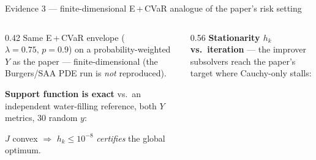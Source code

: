 \documentclass[aspectratio=169,10pt]{beamer}
\newcommand{\fdata}[1]{data/#1}
\begin{document}
\begin{frame}{Evidence 3 --- finite-dimensional E\,+\,CVaR analogue of the paper's risk setting}
  \small
  \begin{columns}[T]
  \begin{column}{0.42\textwidth}
   Same E\,+\,CVaR envelope ($\lambda{=}0.75,\,p{=}0.9$) on a probability-weighted
   $Y$ as the paper --- finite-dimensional (the Burgers/SAA PDE run is \emph{not} reproduced).
   \medskip

   \textbf{Support function is exact} vs.\ an independent water-filling reference,
   both $Y$ metrics, 30 random $y$:
   \medskip
   {\footnotesize\centering\par}
   \medskip
   {\footnotesize $J$ convex $\Rightarrow$ $h_k\le10^{-8}$ \emph{certifies} the global optimum.}
  \end{column}
  \begin{column}{0.56\textwidth}
   \textbf{Stationarity $h_k$ vs.\ iteration} --- the improver subsolvers reach the
   paper's target where Cauchy-only stalls:
   \begin{center}
   \end{center}
  \end{column}
  \end{columns}
\end{frame}
\end{document}
